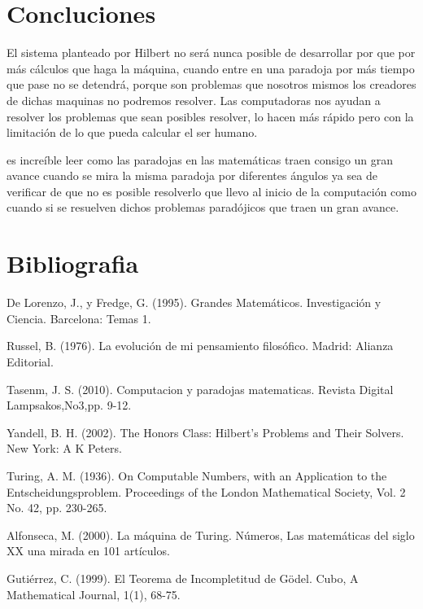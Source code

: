 \documentclass{article}
\begin{document}
\section{Concluciones}

El sistema planteado por Hilbert no será nunca posible de desarrollar  por que por más cálculos que haga la máquina, cuando entre en una paradoja por más tiempo que pase no se detendrá, porque son problemas que nosotros mismos los creadores de dichas maquinas no podremos resolver. Las computadoras nos ayudan a resolver los problemas que sean posibles resolver, lo hacen más rápido pero con la limitación de lo que pueda calcular el ser humano.

\vspace{10pt}

es increíble leer como las paradojas en las matemáticas traen consigo un gran avance cuando se mira la misma paradoja por diferentes ángulos ya sea de verificar de que no es posible resolverlo que llevo al inicio de la computación como cuando si se resuelven dichos problemas paradójicos  que traen un gran avance. 

\vspace{10pt}

\begin{center}
\end{center}

\section{Bibliografia}
De Lorenzo, J., y Fredge, G. (1995). Grandes Matemáticos. Investigación y Ciencia. Barcelona: Temas 1.
\vspace{10pt}

Russel, B. (1976). La evolución de mi pensamiento filosófico. Madrid: Alianza Editorial.
\vspace{10pt}

Tasenm, J. S. (2010). Computacion y paradojas matematicas. Revista Digital Lampsakos,No3,pp. 9-12.
\vspace{10pt}

Yandell, B. H. (2002). The Honors Class: Hilbert's Problems and Their Solvers. New York: A K Peters.
\vspace{10pt}

Turing, A. M. (1936). On Computable Numbers, with an Application to the Entscheidungsproblem. Proceedings of the London Mathematical Society, Vol. 2 No. 42, pp. 230-265.
\vspace{10pt}

Alfonseca, M. (2000). La máquina de Turing. Números, Las matemáticas del siglo XX una mirada en 101 artículos.
\vspace{10pt}

Gutiérrez, C. (1999). El Teorema de Incompletitud de Gödel. Cubo, A Mathematical Journal, 1(1), 68-75.
\vspace{10pt}
\end{document}

